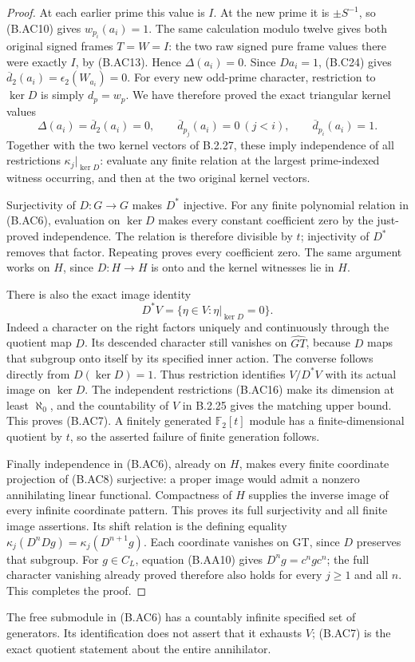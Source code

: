 \begin{proof}
At each earlier prime this value is $I$.
At the new prime it is $\pm S^{-1}$, so (B.AC10)
gives $w_{p_i}(a_i)=1$.
The same calculation modulo twelve gives both
original signed frames $T=W=I$: the two raw
signed pure frame values there were exactly $I$,
by (B.AC13).  Hence $\Delta(a_i)=0$.
Since $Da_i=1$, (B.C24) gives
$\overline d_2(a_i)=\epsilon_2(W_{a_i})=0$.
For every new odd-prime character, restriction
to $\ker D$ is simply $d_p=w_p$.
We have therefore proved the exact triangular
kernel values
\[
 \Delta(a_i)=\overline d_2(a_i)=0,\qquad
 \overline d_{p_j}(a_i)=0\ (j<i),\qquad
                         \overline d_{p_i}(a_i)=1.
 \tag{B.AC16}
\]
Together with the two kernel vectors of B.2.27,
these imply independence of all restrictions
$\kappa_j|_{\ker D}$: evaluate any finite relation
at the largest prime-indexed witness occurring,
and then at the two original kernel vectors.

Surjectivity of $D:G\to G$ makes $D^*$ injective.
For any finite polynomial relation in (B.AC6),
evaluation on $\ker D$ makes every constant
coefficient zero by the just-proved independence.
The relation is therefore divisible by $t$;
injectivity of $D^*$ removes that factor.
Repeating proves every coefficient zero.
The same argument works on $H$, since $D:H\to H$
is onto and the kernel witnesses lie in $H$.

There is also the exact image identity
\[
 D^*V
    =\{\eta\in V:\eta|_{\ker D}=0\}.
 \tag{B.AC17}
\]
Indeed a character on the right factors uniquely
and continuously through the quotient map $D$.
Its descended character still vanishes on
$\widehat{GT}$, because $D$ maps that subgroup
onto itself by its specified inner action.
The converse follows directly from $D(\ker D)=1$.
Thus restriction identifies $V/D^*V$ with its
actual image on $\ker D$.  The independent
restrictions (B.AC16) make its dimension at least
$\aleph_0$, and the countability of $V$ in B.2.25
gives the matching upper bound.  This proves
(B.AC7).  A finitely generated $\mathbb F_2[t]$
module has a finite-dimensional quotient by $t$,
so the asserted failure of finite generation follows.

Finally independence in (B.AC6), already on $H$,
makes every finite coordinate projection of
(B.AC8) surjective: a proper image would admit
a nonzero annihilating linear functional.
Compactness of $H$ supplies the inverse image
of every infinite coordinate pattern.  This
proves its full surjectivity and all finite
image assertions.  Its shift relation is
the defining equality
$\kappa_j(D^nDg)=\kappa_j(D^{n+1}g)$.
Each coordinate vanishes on GT, since $D$
preserves that subgroup.  For $g\in C_L$,
equation (B.AA10) gives $D^ng=c^ngc^n$;
the full character vanishing already proved
therefore also holds for every $j\geq1$ and
all $n$.  This completes the proof.
\end{proof}

The free submodule in (B.AC6) has a countably infinite
specified set of generators.  Its identification does
not assert that it exhausts $V$; (B.AC7) is the exact
quotient statement about the entire annihilator.


